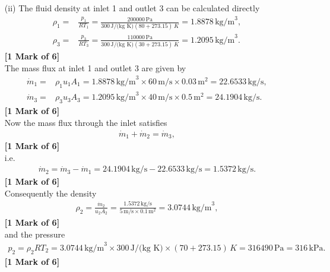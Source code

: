 \documentclass[12pt,twoside]{report}
\begin{document}
\begin{description}
\begin{itemize}
\begin{itemize}
\item[(ii)] The fluid density at inlet 1 and outlet 3 can be calculated directly
\begin{align*}
 \rho_1 =& \frac{p_1}{R T_1} = \frac{200000\,\mbox{Pa}}{300\,\mbox{J/(kg K)} \left(80 + 273.15\right)\,K} = 1.8878\,\mbox{kg/m}^3, \\
 \rho_3 =& \frac{p_3}{R T_3} = \frac{110000\,\mbox{Pa}}{300\,\mbox{J/(kg K)} \left(30 + 273.15\right)\,K} = 1.2095\,\mbox{kg/m}^3.
\end{align*} \hfill \textbf{[1 Mark of 6]} \\
The mass flux at inlet 1 and outlet 3 are given by
\begin{align*}
 \dot{m}_1 =& \rho_1 u_1 A_1 = 1.8878\,\mbox{kg/m}^3 \times 60\,\mbox{m/s} \times 0.03\,\mbox{m}^2 = 22.6533\,\mbox{kg/s}, \\
 \dot{m}_3 =& \rho_3 u_3 A_3 = 1.2095\,\mbox{kg/m}^3 \times 40\,\mbox{m/s} \times 0.5\,\mbox{m}^2 = 24.1904\,\mbox{kg/s}.
\end{align*} \hfill \textbf{[1 Mark of 6]} \\
Now the mass flux through the inlet satisfies
\begin{align*}
 \dot{m}_1 + \dot{m}_2 = \dot{m}_3,
\end{align*} \hfill \textbf{[1 Mark of 6]} \\
i.e.
\begin{align*}
 \dot{m}_2 = \dot{m}_3 - \dot{m}_1 = 24.1904\,\mbox{kg/s} - 22.6533\,\mbox{kg/s} = 1.5372\,\mbox{kg/s}.
\end{align*} \hfill \textbf{[1 Mark of 6]} \\
Consequently the density
\begin{align*}
 \rho_2 = \frac{\dot{m}_2}{u_2 A_2} = \frac{1.5372\,\mbox{kg/s}}{5\,\mbox{m/s} \times 0.1\,\mbox{m}^2} = 3.0744\,\mbox{kg/m}^3,
\end{align*} \hfill \textbf{[1 Mark of 6]} \\
and the pressure
\begin{align*}
 p_2 = \rho_2 R T_2 = 3.0744\,\mbox{kg/m}^3 \times 300\,\mbox{J/(kg K)} \times \left(70 + 273.15\right)\,K = 316490\,\mbox{Pa} = 316\,\mbox{kPa}.
\end{align*} \hfill \textbf{[1 Mark of 6]}


\end{itemize}
\end{itemize}
\end{description}
\end{document}
